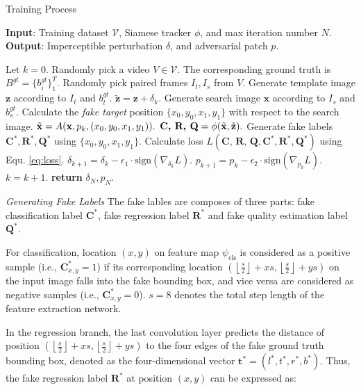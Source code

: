 \documentclass[journal]{IEEEtran}
\begin{document}
\begin{algorithm}[tb]
  \caption{Training Process}
  \label{alg:algorithm}
  \textbf{Input}: Training dataset $\mathcal{V}$, Siamese tracker $\phi$, and max iteration number $N$.\\
  \textbf{Output}: Imperceptible perturbation $\delta$, and adversarial patch $p$.
  \begin{algorithmic}[1] %
  \STATE Let $k = 0$.
  \STATE Randomly pick a video $V\in \mathcal{V}$. The corresponding ground truth is $B^{gt}=\{b^{gt}_i\}^T_1$.
  \STATE Randomly pick paired frames $I_t, I_s$ from $V$.
  \STATE Generate template image $\textbf{z}$ according to $I_t$ and $b^{gt}_t$.
  \STATE $\tilde{\textbf{z}} = \textbf{z} + \delta_k.$
  \STATE Generate search image $\textbf{x}$ according to $I_s$ and $b^{gt}_s$.
  \STATE Calculate the \textit{fake target} position $\{x_0, y_0, x_1, y_1\}$ with respect to the search image.
  \STATE $\tilde{\textbf x} = A(\textbf x, p_k, (x_0, y_0, x_1, y_1)).$
  \STATE $\textbf{C, R, Q} = \phi(\tilde {\textbf x}, \tilde{\textbf z}).$
  \STATE Generate fake labels $\textbf{C}^*,\textbf{R}^*,\textbf{Q}^*$ using $\{x_0, y_0, x_1, y_1\}$.
  \STATE Calculate loss $L(\textbf{C, R, Q}, \textbf{C}^*, \textbf{R}^*, \textbf{Q}^*)$ using Equ. \ref{eq:loss}.
  \STATE $\delta_{k+1} = \delta_{k} - \epsilon_1 \cdot \text{sign}(\nabla_{\delta_k}L).$
  \STATE $p_{k+1} = p_{k} - \epsilon_2 \cdot \text{sign}(\nabla_{p_k}L).$
  \STATE $k = k + 1.$
  \ENDWHILE
  \STATE \textbf{return} $\delta_N, p_N.$
  \end{algorithmic}
  \label{alg}
\end{algorithm}

\textit{Generating Fake Labels} The fake lables are composes of three parts: fake classification label $\textbf{C}^*$, fake regression label $\textbf{R}^*$ and fake quality estimation label $\textbf{Q}^*$.

For classification, location $(x,y)$ on feature map $\psi_{\mathrm{cls}}$ is considered as a positive sample (i.e., $\textbf{C}^*_{x,y} = 1$) if its corresponding location $\left(\left\lfloor\frac{s}{2}\right\rfloor+x s,\left\lfloor\frac{s}{2}\right\rfloor+y s\right)$ on the input image falls into the fake bounding box, and vice versa are considered as negative samples (i.e., $\textbf{C}^*_{x,y} = 0$). $s=8$ denotes the total step length of the feature extraction network.

In the regression branch, the last convolution layer predicts the distance of position $\left(\left\lfloor\frac{s}{2}\right\rfloor+x s,\left\lfloor\frac{s}{2}\right\rfloor+y s\right)$ to the four edges of the fake ground truth bounding box, denoted as the four-dimensional vector $\boldsymbol{t}^{*}=\left(l^{*}, t^{*}, r^{*}, b^{*}\right)$. Thus, the fake regression label $\textbf{R}^*$ at position $(x,y)$ can be expressed as:
\end{document}
